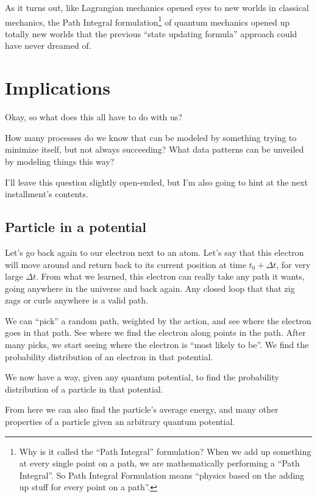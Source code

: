 \documentclass[]{article}
\begin{document}
As it turns out, like Lagrangian mechanics opened eyes to new worlds in
classical mechanics, the Path Integral formulation\footnote{Why is it called the
  ``Path Integral'' formulation? When we add up something at every single point
  on a path, we are mathematically performing a ``Path Integral''. So Path
  Integral Formulation means ``physics based on the adding up stuff for every
  point on a path''.} of quantum mechanics opened up totally new worlds that the
previous ``state updating formula'' approach could have never dreamed of.

\hypertarget{implications}{%
\section{Implications}\label{implications}}

Okay, so what does this all have to do with us?

How many processes do we know that can be modeled by something trying to
minimize itself, but not always succeeding? What data patterns can be unveiled
by modeling things this way?

I'll leave this question slightly open-ended, but I'm also going to hint at the
next installment's contents.

\hypertarget{particle-in-a-potential}{%
\subsection{Particle in a potential}\label{particle-in-a-potential}}

Let's go back again to our electron next to an atom. Let's say that this
electron will move around and return back to its current position at time
\(t_0 + \Delta t\), for very large \(\Delta t\). From what we learned, this
electron can really take any path it wants, going anywhere in the universe and
back again. Any closed loop that that zig zags or curls anywhere is a valid
path.

We can ``pick'' a random path, weighted by the action, and see where the
electron goes in that path. See where we find the electron along points in the
path. After many picks, we start seeing where the electron is ``most likely to
be''. We find the probability distribution of an electron in that potential.

We now have a way, given any quantum potential, to find the probability
distribution of a particle in that potential.

From here we can also find the particle's average energy, and many other
properties of a particle given an arbitrary quantum potential.
\end{document}
